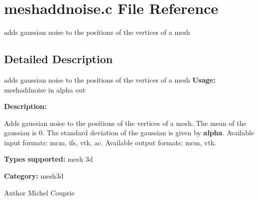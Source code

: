 \section{meshaddnoise.c File Reference}
\label{meshaddnoise_8c}


adds gaussian noise to the positions of the vertices of a mesh  




\subsection{Detailed Description}
adds gaussian noise to the positions of the vertices of a mesh {\bfseries Usage:} meshaddnoise in alpha out

{\bfseries Description:}

Adds gaussian noise to the positions of the vertices of a mesh. The mean of the gaussian is 0. The standard deviation of the gaussian is given by {\bfseries alpha}. Available input formats: mcm, ifs, vtk, ac. Available output formats: mcm, vtk.

{\bfseries Types supported:} mesh 3d

{\bfseries Category:} mesh3d

\begin{DoxyAuthor}{Author}
Michel Couprie 
\end{DoxyAuthor}
